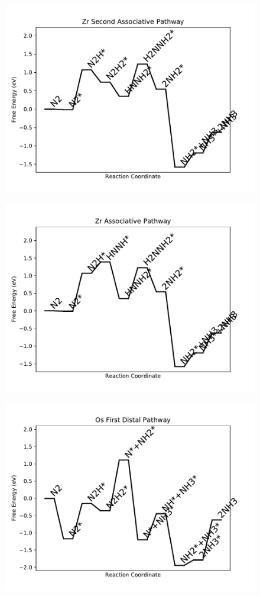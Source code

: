 \begin{figure}
\includegraphics[width=0.8\linewidth]{data/plots/Zr_associative_2.pdf}
\label{fig:Zr_associative_2}
\end{figure}

\begin{figure}
\includegraphics[width=0.8\linewidth]{data/plots/Zr_associative.pdf}
\label{fig:Zr_associative}
\end{figure}

\begin{figure}
\includegraphics[width=0.8\linewidth]{data/plots/Os_distal_1.pdf}
\label{fig:Os_distal_1}
\end{figure}

